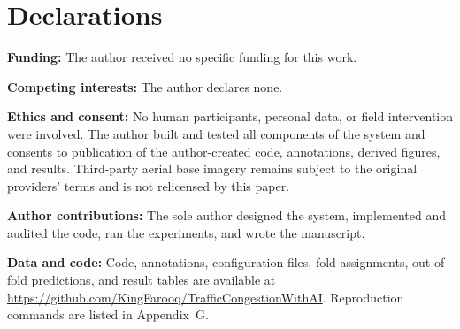 \documentclass[11pt]{article}
\begin{document}
\section*{Declarations}

\noindent\textbf{Funding:} The author received no specific funding for this work.

\noindent\textbf{Competing interests:} The author declares none.

\noindent\textbf{Ethics and consent:} No human participants, personal data, or field intervention were involved. The author built and tested all components of the system and consents to publication of the author-created code, annotations, derived figures, and results. Third-party aerial base imagery remains subject to the original providers' terms and is not relicensed by this paper.

\noindent\textbf{Author contributions:} The sole author designed the system, implemented and audited the code, ran the experiments, and wrote the manuscript.

\noindent\textbf{Data and code:} Code, annotations, configuration files, fold assignments, out-of-fold predictions, and result tables are available at \url{https://github.com/KingFarooq/TrafficCongestionWithAI}. Reproduction commands are listed in Appendix~G.
\end{document}
